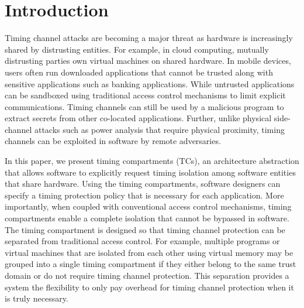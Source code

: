 \section{Introduction}

Timing channel attacks are becoming a major threat as hardware is increasingly 
shared by distrusting entities. For example, in cloud computing, mutually distrusting 
parties own virtual machines on shared hardware. In mobile devices, users often
run downloaded applications that cannot be trusted along with sensitive applications
such as banking applications. While untrusted applications can be sandboxed using
traditional access control mechanisms to limit explicit communications. Timing 
channels can still be used by a malicious program to extract secrets from other
co-located applications.
Further, unlike physical side-channel attacks such as power analysis that require
physical proximity, timing channels can be exploited in software by remote
adversaries.



In this paper, we present timing compartments (TCs), an architecture abstraction 
that allows software to explicitly request timing isolation among software entities
that share hardware.
Using the timing compartments, software designers can specify a timing protection
policy that is necessary for each application. More importantly, when coupled with
conventional access control mechanisms, timing compartments enable a complete
isolation that cannot be bypassed in software. 
The timing compartment is designed so that timing channel protection can be
separated from traditional access control. For example, multiple programs or
virtual machines that are isolated from each other using virtual memory may
be grouped into a single timing compartment if they either belong to the 
same trust domain or do not require timing channel protection. 
This separation provides a system the flexibility to only pay overhead for
timing channel protection when it is truly necessary.

